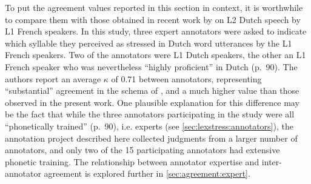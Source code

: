 		
%							
%			
%			
%			
%			
%			
%			
%
%			
%			
		
		
		
		
	To put the agreement values reported in this section in context, it is worthwhile to compare them with those obtained in recent work by \textcite{Michaux2013} on L2 Dutch speech by L1 French speakers. In this study, three expert annotators were asked to indicate which
	 syllable they perceived as stressed in Dutch word utterances by the L1 French speakers. Two of the annotators were L1 Dutch speakers, the other an L1 French speaker who was nevertheless ``highly proficient'' in Dutch (p.~90). The authors report an average $\kappa$ of 0.71 between annotators, representing ``substantial'' agreement in the schema of \textcite{Landis1977}, and a much higher value than those observed in the present work. One plausible explanation for this difference may be the fact that while the three annotators participating in the \textcite{Michaux2013} study were all ``phonetically trained'' (p.~90), i.e. experts (see \cref{sec:lexstress:annotators}),
	the annotation project described here collected judgments from a larger number of annotators, and only two of the 15 participating annotators had extensive phonetic training. The relationship between annotator expertise and inter-annotator agreement is explored further in \cref{sec:agreement:expert}. 
		
